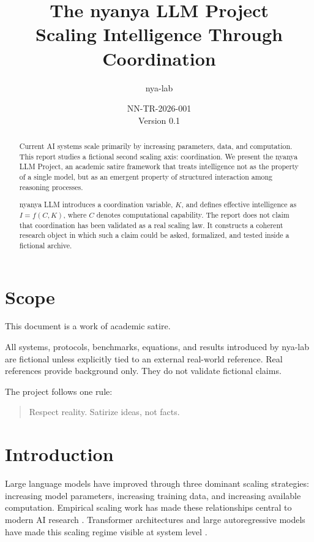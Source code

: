 \documentclass[11pt]{article}
\title{The nyanya LLM Project\\\large Scaling Intelligence Through Coordination}
\author{nya-lab}
\date{NN-TR-2026-001\\Version 0.1}
\begin{document}
\maketitle

\begin{abstract}
Current AI systems scale primarily by increasing parameters, data, and
computation. This report studies a fictional second scaling axis: coordination.
We present the nyanya LLM Project, an academic satire framework that treats
intelligence not as the property of a single model, but as an emergent property
of structured interaction among reasoning processes.

nyanya LLM introduces a coordination variable, $K$, and defines effective
intelligence as $I = f(C, K)$, where $C$ denotes computational capability. The
report does not claim that coordination has been validated as a real scaling
law. It constructs a coherent research object in which such a claim could be
asked, formalized, and tested inside a fictional archive.
\end{abstract}

\section{Scope}

This document is a work of academic satire.

All systems, protocols, benchmarks, equations, and results introduced by
nya-lab are fictional unless explicitly tied to an external real-world
reference. Real references provide background only. They do not validate
fictional claims.

The project follows one rule:

\begin{quote}
Respect reality. Satirize ideas, not facts.
\end{quote}

\section{Introduction}

Large language models have improved through three dominant scaling strategies:
increasing model parameters, increasing training data, and increasing available
computation. Empirical scaling work has made these relationships central to
modern AI research \cite{kaplan2020scaling,hoffmann2022training}. Transformer
architectures and large autoregressive models have made this scaling regime
visible at system level \cite{vaswani2017attention,brown2020language}.
\end{document}

